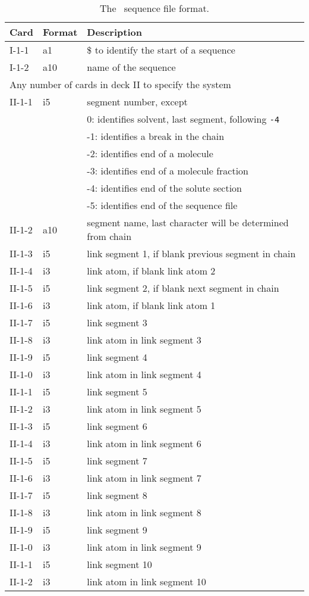 \begin{table}[htbp]
\begin{center}
\begin{tabular*}{150mm}{p{12mm}p{12mm}l}
\hline\hline
Card & Format & Description \\ \hline
I-1-1  & a1     & \$ to identify the start of a sequence \\ %
I-1-2  & a10    & name of the sequence\\
\multicolumn{3}{l}{Any number of cards in deck II to specify the system} \\
II-1-1 & i5     & segment number, except\\
       &        &  0: identifies solvent, last segment, following \verb+-4+\\
       &        & -1: identifies a break in the chain\\
       &        & -2: identifies end of a molecule\\
       &        & -3: identifies end of a molecule fraction\\
       &        & -4: identifies end of the solute section\\
       &        & -5: identifies end of the sequence file\\
II-1-2 & a10    & segment name, last character will be determined from chain\\
II-1-3 & i5     & link segment 1, if blank previous segment in chain\\
II-1-4 & i3     & link atom, if blank link atom 2\\
II-1-5 & i5     & link segment 2, if blank next segment in chain\\
II-1-6 & i3     & link atom, if blank link atom 1\\
II-1-7 & i5     & link segment 3\\
II-1-8 & i3     & link atom in link segment 3\\
II-1-9 & i5     & link segment 4\\
II-1-0 & i3     & link atom in link segment 4\\
II-1-1 & i5     & link segment 5\\
II-1-2 & i3     & link atom in link segment 5\\
II-1-3 & i5     & link segment 6\\
II-1-4 & i3     & link atom in link segment 6\\
II-1-5 & i5     & link segment 7\\
II-1-6 & i3     & link atom in link segment 7\\
II-1-7 & i5     & link segment 8\\
II-1-8 & i3     & link atom in link segment 8\\
II-1-9 & i5     & link segment 9\\
II-1-0 & i3     & link atom in link segment 9\\
II-1-1 & i5     & link segment 10\\
II-1-2 & i3     & link atom in link segment 10\\
\hline\hline
\end{tabular*}
\caption{The \nwargos\ sequence file format.\label{tbl:nwaseq}}
\end{center}
\end{table}

